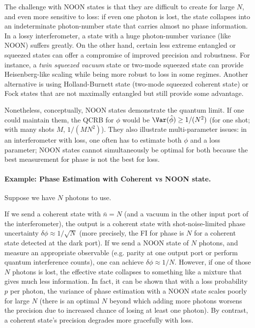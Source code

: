 The challenge with NOON states is that they are difficult to create
for large $N$, and even more sensitive to loss: if even one photon is
lost, the state collapses into an indeterminate photon-number state
that carries almost no phase information. In a lossy interferometer, a
state with a huge photon-number variance (like NOON) suffers
greatly. On the other hand, certain less extreme entangled or squeezed
states can offer a compromise of improved precision and
robustness. For instance, a \emph{twin squeezed vacuum} state or
two-mode squeezed state can provide Heisenberg-like scaling while
being more robust to loss in some regimes. Another alternative is
using Holland-Burnett state (two-mode squeezed coherent state) or Fock
states that are not maximally entangled but still provide some
advantage.



Nonetheless, conceptually, NOON states demonstrate the quantum
limit. If one could maintain them, the QCRB for $\phi$ would be
$\Var(\hat{\phi}) \ge 1/(N^2)$ (for one shot; with many shots $M$,
$1/(M N^2)$). They also illustrate multi-parameter issues: in an
interferometer with loss, one often has to estimate both $\phi$ and a
loss parameter; NOON states cannot simultaneously be optimal for both
because the best measurement for phase is not the best for loss.



\paragraph{Example: Phase Estimation with Coherent vs NOON state.} Suppose we have $N$ photons to use.



If we send a coherent state with $\bar{n}=N$ (and a vacuum in the
other input port of the interferometer), the output is a coherent
state with shot-noise-limited phase uncertainty $\delta \phi \approx
1/\sqrt{N}$ (more precisely, the FI for phase is $N$ for a coherent
state detected at the dark port).  If we send a NOON state of $N$
photons, and measure an appropriate observable (e.g. parity at one
output port or perform quantum interference counts), one can achieve
$\delta \phi \approx 1/N$. However, if one of those $N$ photons is
lost, the effective state collapses to something like a mixture that
gives much less information. In fact, it can be shown that with a loss
probability $p$ per photon, the variance of phase estimation with a
NOON state scales poorly for large $N$ (there is an optimal $N$ beyond
which adding more photons worsens the precision due to increased
chance of losing at least one photon). By contrast, a coherent state’s
precision degrades more gracefully with loss.




